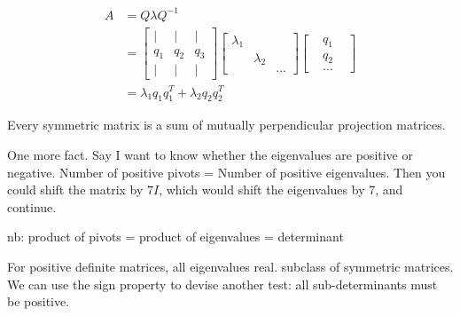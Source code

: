 \documentclass{article}
\begin{document}
\begin{align}
A &= Q \lambda Q^{-1} \\
&=
\begin{bmatrix}
\vert  & \vert & \vert \\
q_1 & q_2 & q_3 \\
\vert & \vert & \vert
\end{bmatrix}
\begin{bmatrix}
\lambda_1 \\
& \lambda_2 \\
& & ...
\end{bmatrix}
\begin{bmatrix}
 & q_1 & \\
 & q_2 & \\
& ...
\end{bmatrix} \\
&= \lambda_1 q_1 q_1^T + \lambda_2 q_2 q_2^T
\end{align}

Every symmetric matrix is a sum of mutually perpendicular projection matrices.

One more fact. Say I want to know whether the eigenvalues are positive or negative. Number of positive pivots = Number of positive eigenvalues. Then you could shift the matrix by $7I$, which would shift the eigenvalues by 7, and continue.

nb: product of pivots = product of eigenvalues = determinant

For positive definite matrices, all eigenvalues real. subclass of symmetric matrices. We can use the sign property to devise another test: all sub-determinants must be positive.
\end{document}

